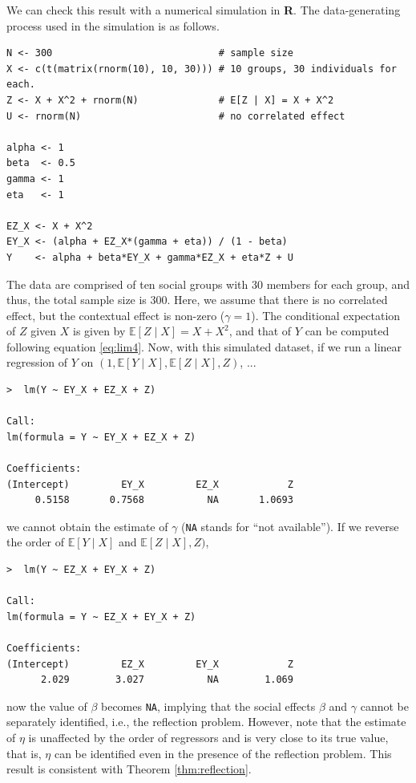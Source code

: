 \documentclass[10.5pt, A4paper, openany, uplatex]{book}
\newcommand{\R}{\textbf{R}}
\newcommand{\E}{\mathbb{E}}
\numberwithin{equation}{section}
\begin{document}
We can check this result with a numerical simulation in \R.
The data-generating process used in the simulation is as follows.
\begin{lstlisting}[basicstyle=\ttfamily\footnotesize, frame=single]
N <- 300                             # sample size
X <- c(t(matrix(rnorm(10), 10, 30))) # 10 groups, 30 individuals for each.
Z <- X + X^2 + rnorm(N)              # E[Z | X] = X + X^2
U <- rnorm(N)                        # no correlated effect
 
alpha <- 1
beta  <- 0.5
gamma <- 1
eta   <- 1
 
EZ_X <- X + X^2
EY_X <- (alpha + EZ_X*(gamma + eta)) / (1 - beta)
Y    <- alpha + beta*EY_X + gamma*EZ_X + eta*Z + U
 \end{lstlisting}
The data are comprised of ten social groups with 30 members for each group, and thus, the total sample size is 300.
Here, we assume that there is no correlated effect, but the contextual effect is non-zero ($\gamma = 1$).
The conditional expectation of $Z$ given $X$ is given by $\E[Z \mid X] = X + X^2$, and that of $Y$ can be computed following equation \eqref{eq:lim4}.
Now, with this simulated dataset, if we run a linear regression of $Y$ on $(1, \E[Y \mid X], \E[Z \mid X], Z)$, ...
\begin{lstlisting}[basicstyle=\ttfamily\footnotesize, frame=single]
>  lm(Y ~ EY_X + EZ_X + Z)

Call:
lm(formula = Y ~ EY_X + EZ_X + Z)

Coefficients:
(Intercept)         EY_X         EZ_X            Z  
	 0.5158       0.7568           NA       1.0693 
\end{lstlisting}
we cannot obtain the estimate of $\gamma$ (\texttt{NA} stands for ``not available'').
If we reverse the order of $\E[Y \mid X]$ and $\E[Z \mid X], Z)$,
\begin{lstlisting}[basicstyle=\ttfamily\footnotesize, frame=single]
>  lm(Y ~ EZ_X + EY_X + Z)

Call:
lm(formula = Y ~ EZ_X + EY_X + Z)
	
Coefficients:
(Intercept)         EZ_X         EY_X            Z  
	  2.029        3.027           NA        1.069
\end{lstlisting}
now the value of $\beta$ becomes \texttt{NA}, implying that the social effects $\beta$ and $\gamma$ cannot be separately identified, i.e., the reflection problem.
However, note that the estimate of $\eta$ is unaffected by the order of regressors and is very close to its true value, that is, $\eta$ can be identified even  in the presence of the reflection problem.
This result is consistent with Theorem \ref{thm:reflection}.
\end{document}
